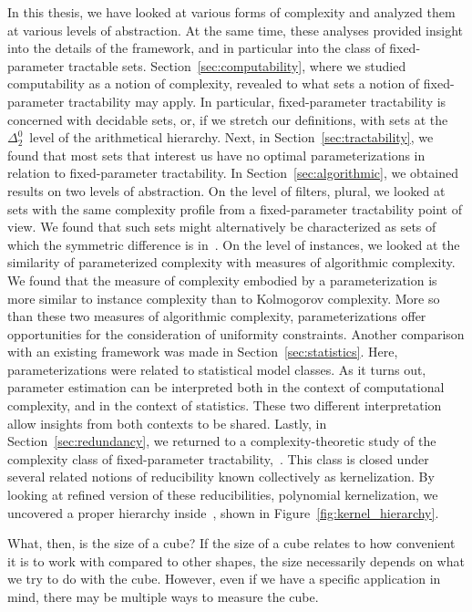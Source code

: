 In this thesis, we have looked at various forms of complexity and analyzed them at various levels of abstraction.
At the same time, these analyses provided insight into the details of the framework, and in particular into the class of fixed-parameter tractable sets.
Section~\ref{sec:computability}, where we studied computability as a notion of complexity, revealed to what sets a notion of fixed-parameter tractability may apply.
In particular, fixed-parameter tractability is concerned with decidable sets, or, if we stretch our definitions, with sets at the $\Delta^0_2$~level of the arithmetical hierarchy.
Next, in Section~\ref{sec:tractability}, we found that most sets that interest us have no optimal parameterizations in relation to fixed-parameter tractability.
In Section~\ref{sec:algorithmic}, we obtained results on two levels of abstraction.
On the level of filters, plural, we  looked at sets with the same complexity profile from a fixed-parameter tractability point of view.
We found that such sets might alternatively be characterized as sets of which the symmetric difference is in~.
On the level of instances, we looked at the similarity of parameterized complexity with measures of algorithmic complexity.
We found that the measure of complexity embodied by a parameterization is more similar to instance complexity than to Kolmogorov complexity.
More so than these two measures of algorithmic complexity, parameterizations offer opportunities for the consideration of uniformity constraints.
Another comparison with an existing framework was made in Section~\ref{sec:statistics}.
Here, parameterizations were related to statistical model classes.
As it turns out, parameter estimation can be interpreted both in the context of computational complexity, and in the context of statistics.
These two different interpretation allow insights from both contexts to be shared.
Lastly, in Section~\ref{sec:redundancy}, we returned to a complexity-theoretic study of the complexity class of fixed-parameter tractability,~.
This class is closed under several related notions of reducibility known collectively as kernelization.
By looking at refined version of these reducibilities, polynomial kernelization, we uncovered a proper hierarchy inside~, shown in Figure~\ref{fig:kernel_hierarchy}.

\medbreak
What, then, is the size of a cube?
If the size of a cube relates to how convenient it is to work with compared to other shapes, the size necessarily depends on what we try to do with the cube.
However, even if we have a specific application in mind, there may be multiple ways to measure the cube.

